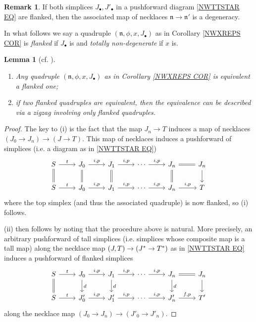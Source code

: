\documentclass[a4paper,10pt]{article}%
\numberwithin{equation}{section}
\numberwithin{figure}{section}
\newtheorem{lemma}[equation]{Lemma}%
\theoremstyle{definition} %
\newtheorem{remark}[equation]{Remark}%
\begin{document}
\begin{remark}\label{FLNKNECDEG REM}
	If both simplices 
	$J_{\bullet},J'_{\bullet}$ in a pushforward diagram
	\eqref{NWTTSTAR EQ}
	are flanked,
	then the associated map of necklaces
	$\mathfrak{n} \to \mathfrak{n}'$
	is a degeneracy.
\end{remark}


In what follows we say a quadruple
$(\mathfrak{n},\phi,x,J_{\bullet})$
as in Corollary \ref{NWXREPS COR}
is \emph{flanked} if $J_{\bullet}$ is and
\emph{totally non-degenerate} if $x$ is.


\begin{lemma}[{cf. \cite[Lemma 4.5]{DS11}}]
	\label{FLANKING LEM}
	\begin{enumerate}[label=(\roman*)]
		\item Any quadruple $(\mathfrak{n},\phi,x,J_{\bullet})$
		as in Corollary \ref{NWXREPS COR} is equivalent a flanked one;
		\item if two flanked quadruples are equivalent, then the equivalence can be described via a zigzag involving only flanked quadruples.
	\end{enumerate}
\end{lemma}


\begin{proof}
	The key to (i) is the fact that 
	the map $J_n \to T$
	induces a map of necklaces
	$(J_0 \to J_n) \to (J \to T)$.
	This map of necklaces induces a pushforward of simplices
	(i.e. a diagram as in \eqref{NWTTSTAR EQ})
\begin{equation}\label{FLANKING EQ}
\begin{tikzcd}
	S \ar{r}{t} \ar[equal]{d}
&
	J_0 \ar{r}{i,p} \ar[equal]{d}
&
	J_1 \ar{r}{i,p} \ar[equal]{d}
&
	\cdots
	\ar{r}{i,p}
&
	J_n \ar[equal]{r} \ar[equal]{d}
&
	J_n \ar{d}
\\
	S \ar{r}{t}
&
	J_0 \ar{r}{i,p}
&
	J_1 \ar{r}{i,p}
&
	\cdots
	\ar{r}{i,p}
&
	J_n \ar{r}{i,p}
&
	T
\end{tikzcd}
\end{equation}	
	where the top simplex (and thus the associated quadruple) is now flanked, so (i) follows.

	(ii) then follows by noting that the procedure above is natural.
	More precisely, 
	an arbitrary pushforward of tall simplices
	(i.e. simplices whose composite map is a tall map)
	along the necklace map $(J,T) \to (J^{\**} \to T^{\**})$
	as in \eqref{NWTTSTAR EQ}
	induces a pushforward of flanked simplices
\begin{equation}
\begin{tikzcd}
	S \ar{r}{t} \ar[equal]{d}
&
	J_0 \ar{r}{i,p} \ar{d}{d}
&
	J_1 \ar{r}{i,p} \ar{d}{d}
&
	\cdots \ar{r}{i,p}
&
	J_n \ar[equal]{r} \ar{d}{d}
&
	J_n \ar{d}
\\
	S \ar{r}{t} 
&
	J'_0 \ar{r}{i,p}
&
	J'_1 \ar{r}{i,p}
&
	\cdots \ar{r}{i,p}
&
	J'_n \ar{r}{f,p}
&
	T'
\end{tikzcd}
\end{equation}
along the necklace map
$(J_0 \to J_n) \to (J'_0 \to J'_n)$.
\end{proof}
\end{document}
